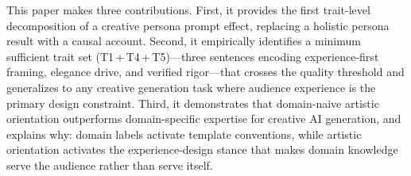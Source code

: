 This paper makes three contributions. First, it provides the first trait-level
decomposition of a creative persona prompt effect, replacing a holistic persona result
with a causal account. Second, it empirically identifies a minimum sufficient trait set
(T1\,+\,T4\,+\,T5)---three sentences encoding experience-first framing, elegance drive,
and verified rigor---that crosses the quality threshold and generalizes to any creative
generation task where audience experience is the primary design constraint. Third, it
demonstrates that domain-naive artistic orientation outperforms domain-specific expertise
for creative AI generation, and explains why: domain labels activate template conventions,
while artistic orientation activates the experience-design stance that makes domain
knowledge serve the audience rather than serve itself.
